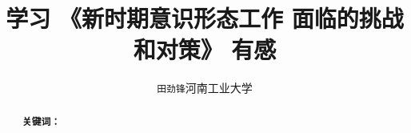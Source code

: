 \documentclass[cs5size,b5paper,nofonts]{ctexart}
\def\tjf{{\tt{田劲锋}}}
\def\titlec{学习 《新时期意识形态工作 面临的挑战和对策》 有感}
\begin{document}
\title{\titlec}
\author{\tjf\quad 河南工业大学}
\maketitle

\begin{abstract}

{\bf 关键词：}
\end{abstract}



\end{document}
